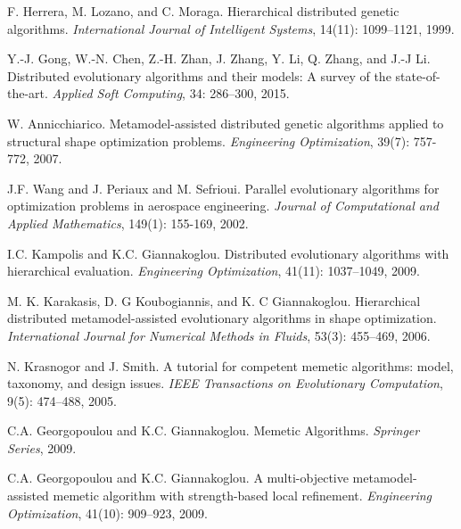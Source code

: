 \documentclass[twoside, 12pt,notitlepage]{report}
\begin{document}
\begin{thebibliography}{9}


F. Herrera, M. Lozano, and C. Moraga. Hierarchical 
distributed genetic algorithms. \textit{International 
Journal of Intelligent Systems}, 14(11): 1099–1121, 1999.

Y.-J. Gong, W.-N. Chen, Z.-H. Zhan, J. Zhang, Y. Li, Q. 
Zhang, and J.-J Li. Distributed evolutionary algorithms 
and their models: A survey of the state-of-the-art. 
\textit{Applied Soft Computing}, 34: 286–300, 2015.

W. Annicchiarico. Metamodel-assisted distributed genetic 
algorithms applied to structural shape optimization 
problems. \textit{Engineering Optimization}, 39(7): 
757-772, 2007.

J.F. Wang and J. Periaux and M. Sefrioui. Parallel 
evolutionary algorithms for optimization problems in 
aerospace engineering. \textit{Journal of Computational 
and Applied Mathematics}, 149(1): 155-169, 2002.

I.C. Kampolis and K.C. Giannakoglou. Distributed 
evolutionary algorithms with hierarchical evaluation. 
\textit{Engineering Optimization}, 41(11): 1037–1049, 
2009.

M. K. Karakasis, D. G Koubogiannis, and K. C Giannakoglou. 
Hierarchical distributed metamodel-assisted evolutionary 
algorithms in shape optimization. \textit{International 
Journal for Numerical Methods in Fluids}, 53(3): 455–469, 
2006.


N. Krasnogor and J. Smith. A tutorial for competent 
memetic algorithms: model, taxonomy, and design issues. 
\textit{IEEE Transactions on Evolutionary Computation},
9(5): 474–488, 2005.

C.A. Georgopoulou and K.C. Giannakoglou.
Memetic Algorithms. \textit{Springer Series}, 2009.

C.A. Georgopoulou and K.C. Giannakoglou. A multi-objective 
metamodel-assisted memetic algorithm with strength-based 
local refinement. \textit{Engineering Optimization},
41(10): 909–923, 2009.


\end{thebibliography}
\end{document}

